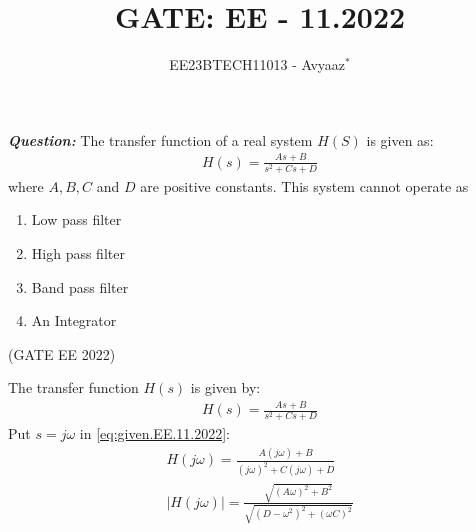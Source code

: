 \documentclass[journal,12pt,twocolumn]{IEEEtran}
\theoremstyle{remark}
\begin{document}

\vspace{3cm}

\title{GATE: EE - 11.2022}
\author{EE23BTECH11013 - Avyaaz$^{*}$%
}
\maketitle
\newpage
\bigskip

\renewcommand{\thefigure}{\arabic{figure}}
\renewcommand{\thetable}{\arabic{table}}

\large\textbf{\textsl{Question:}}
The transfer function of a real system $H(S)$ is given as:
\begin{align}
    H(s) = \frac{As + B}{s^2 + Cs + D}\nonumber
\end{align}
where $A, B, C$ and $D$ are positive constants. This system cannot operate as
\begin{enumerate}[label={(\Alph*)}]
    \item Low pass filter
    \item High pass filter
    \item Band pass filter
    \item An Integrator
\end{enumerate}\hfill(GATE EE 2022) \\
\solution

The transfer function $H(s)$ is given by: 
\begin{align}
    H(s) = \frac{As + B}{s^2 + Cs + D}\label{eq:given.EE.11.2022}
\end{align}
Put $s = j\omega$ in \eqref{eq:given.EE.11.2022}:
\begin{align}
    H(j\omega) = \frac{A(j\omega) + B}{(j\omega)^2 + C(j\omega) + D} \\
    |H(j\omega)| = \frac{\sqrt{(A\omega)^2 + B^2}}{\sqrt{(D - \omega^2)^2 + (\omega C)^2}}\label{eq:magnitude.EE.11.2022}
\end{align}
\end{document}
